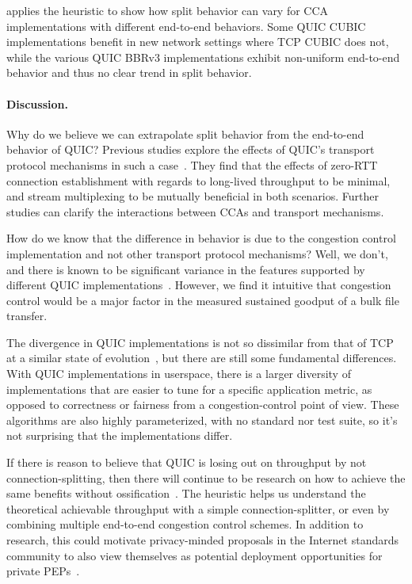 

 applies the heuristic to show how split behavior
can vary for CCA implementations with different end-to-end behaviors.
Some QUIC CUBIC implementations
benefit in new network settings where TCP CUBIC does not, while the various
QUIC BBRv3 implementations exhibit non-uniform end-to-end behavior and thus no
clear trend in split behavior.

\paragraph{Discussion.}

Why do we believe we can extrapolate split behavior from the end-to-end behavior
of QUIC? Previous studies explore the effects of QUIC's transport protocol
mechanisms in such a case~\cite{kosek2022quicpep,thomas2019google}. They find
that the effects of zero-RTT connection establishment with regards to
long-lived throughput to be minimal, and stream multiplexing to be mutually
beneficial in both scenarios. Further studies can clarify the interactions
between CCAs and transport mechanisms.

How do we know that the difference in behavior is due to the congestion control
implementation and not other transport protocol mechanisms? Well, we
don't, and there is known to be significant variance in the features supported
by different QUIC implementations~\cite{marx2020same}.
However, we find it intuitive that congestion control would be a major factor in
the measured sustained goodput of a bulk file transfer.

The divergence in QUIC implementations is not so dissimilar from that of TCP at
a similar state of evolution~\cite{allman1999effective}, but there are still
some fundamental differences. With QUIC implementations in userspace, there is
a larger diversity of implementations that are easier to tune for a specific
application metric, as opposed to correctness or fairness from a
congestion-control point of view. These algorithms are also highly
parameterized, with no standard nor test suite, so it's not surprising that the
implementations differ.

If there is reason to believe
that QUIC is losing out on throughput by not connection-splitting, then there
will continue to be research on how to achieve the same benefits without
ossification~\cite{kosek2023secure,yuan2024sidekick,kramer2021masquepep,yuan2022sidecar}.
The heuristic helps us understand the theoretical achievable
throughput with a simple connection-splitter, or even by combining multiple
end-to-end congestion control schemes.
In addition to research, this could motivate privacy-minded proposals in the Internet
standards community to also view themselves as potential deployment opportunities
for private PEPs~\cite{kosek2021masque,sattler2022towards,rfc9297,rfc9298}.

